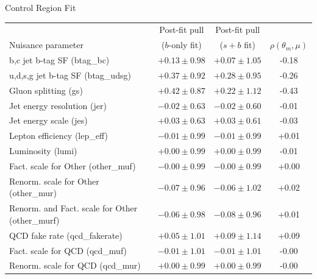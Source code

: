 \begin{subsection}{Control Region Fit}
\begin{table}[tbp!]
\begin{center}
\begin{tabular}{|l|c|c|c|} \hline
                                                  &  Post-fit pull     &  Post-fit pull     &                           \\
Nuisance parameter                                &  ($b$-only fit)    &  ($s+b$ fit)       &  $\rho(\theta_{m}, \mu)$  \\  
\hline
b,c jet b-tag SF (btag\_bc)                       &  $+0.13 \pm 0.98$  &  $+0.07 \pm 1.05$  &  -0.18                    \\
u,d,s,g jet b-tag SF (btag\_udsg)                 &  $+0.37 \pm 0.92$  &  $+0.28 \pm 0.95$  &  -0.26                    \\
Gluon splitting (gs)                              &  $+0.42 \pm 0.87$  &  $+0.22 \pm 1.12$  &  -0.43                    \\
Jet energy resolution (jer)                       &  $-0.02 \pm 0.63$  &  $-0.02 \pm 0.60$  &  -0.01                    \\
Jet energy scale (jes)                            &  $+0.03 \pm 0.63$  &  $+0.03 \pm 0.61$  &  -0.03                    \\
Lepton efficiency (lep\_eff)                      &  $-0.01 \pm 0.99$  &  $-0.01 \pm 0.99$  &  +0.01                    \\   
Luminosity (lumi)                                 &  $+0.00 \pm 0.99$  &  $+0.00 \pm 0.99$  &  -0.01                    \\   
Fact. scale for Other (other\_muf)                &  $-0.00 \pm 0.99$  &  $-0.00 \pm 0.99$  &  +0.00                    \\   
Renorm. scale for Other (other\_mur)              &  $-0.07 \pm 0.96$  &  $-0.06 \pm 1.02$  &  +0.02                    \\   
Renorm. and Fact. scale for Other (other\_murf)   &  $-0.06 \pm 0.98$  &  $-0.08 \pm 0.96$  &  +0.01                    \\   
QCD fake rate (qcd\_fakerate)                     &  $+0.05 \pm 1.01$  &  $+0.09 \pm 1.14$  &  +0.09                    \\   
Fact. scale for QCD (qcd\_muf)                    &  $-0.01 \pm 1.01$  &  $-0.01 \pm 1.01$  &  -0.00                    \\   
Renorm. scale for QCD (qcd\_mur)                  &  $+0.00 \pm 0.99$  &  $+0.00 \pm 0.99$  &  -0.00                    \\   

\end{tabular}
\end{center}
\end{table}
\end{subsection}
